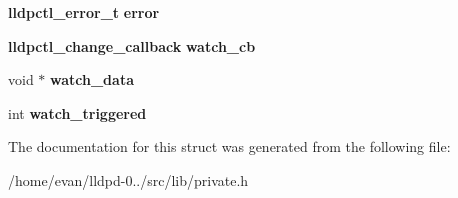 \begin{DoxyCompactItemize}
\item 
{\bf lldpctl\-\_\-error\-\_\-t} {\bfseries error}\label{structlldpctl__conn__t_a38ac8efcbaacb5b064d30fecd4641f3d}

\item 
{\bf lldpctl\-\_\-change\-\_\-callback} {\bfseries watch\-\_\-cb}\label{structlldpctl__conn__t_a533c150b621186fbb7aafb400d66b442}

\item 
void $\ast$ {\bfseries watch\-\_\-data}\label{structlldpctl__conn__t_aec8aed01a4c7d618b80c3a4edc4862bf}

\item 
int {\bfseries watch\-\_\-triggered}\label{structlldpctl__conn__t_a7ec96d5687e1103ab43168093265af3f}

\end{DoxyCompactItemize}


\-The documentation for this struct was generated from the following file\-:\begin{DoxyCompactItemize}
\item 
/home/evan/lldpd-\/0../src/lib/private.\-h\end{DoxyCompactItemize}
